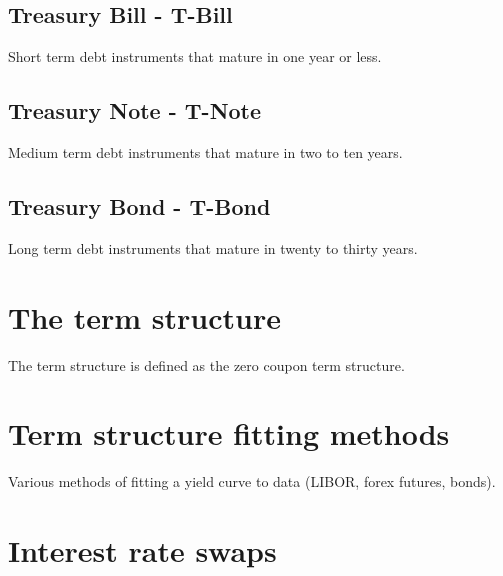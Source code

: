 \subsection{Treasury Bill - T-Bill}
Short term debt instruments that mature in one year or less.
\subsection{Treasury Note - T-Note}
Medium term debt instruments that mature in two to ten years.
\subsection{Treasury Bond - T-Bond}
Long term debt instruments that mature in twenty to thirty years.

\section{The term structure}
The term structure is defined as the zero coupon term structure.

\section{Term structure fitting methods}
Various methods of fitting a yield curve to data (LIBOR, forex futures, bonds).

\section{Interest rate swaps}
